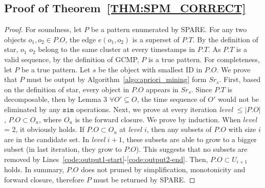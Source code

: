 \subsection{Proof of Theorem~\ref{THM:SPM_CORRECT}}
\label{apx:spm_correct}
\begin{proof}
For soundness, let $P$ be a pattern enumerated by SPARE. For any two objects $o_1, o_2 \in P.O$, the edge $e(o_1,o_2)$ is a superset of $P.T$. By the definition of star, $o_1$ $o_2$ belong to the same cluster at every timestamps in $P.T$. As $P.T$ is a valid sequence, by the definition of GCMP, $P$ is a true pattern.
For completeness, let $P$ be a true pattern. Let $s$ be the object with smallest ID in $P.O$. We prove that $P$ must be output by Algorithm~\ref{algo:apriori_mining} form $Sr_s$. 
First, based on the definition of star, every object in $P.O$ appears in $Sr_s$. Since $P.T$ is decomposable, then by Lemma 3 $\forall O' \subseteq O$, the time sequence of $O'$ would not be eliminated by any $\mathtt{sim}$ operations.  Next, we prove at every iteration \emph{level} $\leq |P.O|$, $P.O \subset O_u$, where $O_u$ is the forward closure. We prove by induction. When $level$ = 2, it obviously holds. If $P.O \subset O_u$ at \emph{level $i$}, then any subsets of $P.O$ with size $i$ are in the candidate set. In \emph{level} $i+1$, these subsets are able to grow to a bigger subset (in last iteration, they grow to $P.O$). This suggests that no subsets are removed by Lines~\ref{code:output1-start}-\ref{code:output2-end}. Then, $P.O \subset U_{i+1}$ holds. In summary, $P.O$ does not pruned by simplification, monotonicity and forward closure, therefore $P$ must be returned by SPARE.
\end{proof}